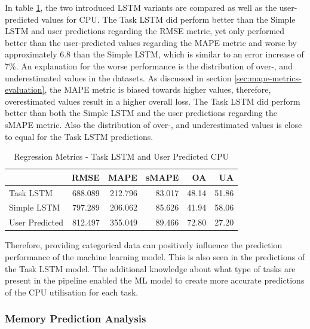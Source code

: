       In table \ref{tab:regression-metrics-task-lstm-user-predicted-cpu}, the two introduced LSTM variants are compared as well as the user-predicted values for CPU.
      The Task LSTM did perform better than the Simple LSTM and user predictions regarding the RMSE metric, yet only performed better than the user-predicted values regarding the MAPE metric and worse by approximately $6.8$ than the Simple LSTM, which is similar to an error increase of 7\%. An explanation for the worse performance is the distribution of over-, and underestimated values in the datasets. As discussed in section \ref{sec:mape-metrics-evaluation}, the MAPE metric is biased towards higher values, therefore, overestimated values result in a higher overall loss.
      The Task LSTM did perform better than both the Simple LSTM and the user predictions regarding the sMAPE metric.
      Also the distribution of over-, and underestimated values is close to equal for the Task LSTM predictions.

      \begin{table}
        \centering
        \caption{Regression Metrics - Task LSTM and User Predicted CPU}
        \label{tab:regression-metrics-task-lstm-user-predicted-cpu}
        \begin{tabular}{|l|rrrrr|}
          \toprule
          {} &     RMSE &     MAPE &   sMAPE &     OA &     UA \\
          \midrule
          Task LSTM   &  688.089 &  212.796 &  83.017 &  48.14 &  51.86 \\
          Simple LSTM &  797.289 &  206.062 &  85.626 &  41.94 &  58.06 \\
          User Predicted &  812.497 &  355.049 &  89.466 &  72.80 &  27.20 \\
          \bottomrule
        \end{tabular}
      \end{table}

      Therefore, providing categorical data can positively influence the prediction performance of the machine learning model. This is also seen in the predictions of the Task LSTM model. The additional knowledge about what type of tasks are present in the pipeline enabled the ML model to create more accurate predictions of the CPU utilisation for each task.
      

    \subsubsection{Memory Prediction Analysis}
    \label{sec:mem-prediction-analysis-task-knowledge-lstm-evaluation}

